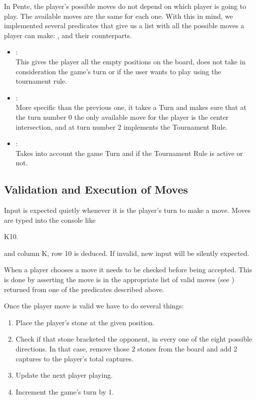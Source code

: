 \documentclass[12pt,a4paper,notitlepage]{article}
\begin{document}
In Pente, the player's possible moves do not depend on which player is going to play. The available moves are the same for each one.
With this in mind, we implemented several predicates that give us a list with all the possible moves a player can make: ,  and their  counterparts.

\begin{itemize}[noitemsep]
\item {}: \\
This gives the player all the empty positions on the board, does not take in consideration the game's turn or if the user wants to play using the tournament rule.
\item {}: \\
More specific than the previous one, it takes a Turn and makes sure that at the turn number 0 the only available move for the player is the center intersection, and at turn number 2 implements the Tournament Rule.
\item {}: \\
Takes into account the game Turn and if the Tournament Rule is active or not.
\end{itemize}

\subsection{Validation and Execution of Moves}
\label{subsec:moves}

Input is expected quietly whenever it is the player's turn to make a move.
Moves are typed into the console like
\begin{center}
	\ttfamily K10.
\end{center}
and column K, row 10 is deduced. If invalid, new input will be silently expected.

When a player chooses a move it needs to be checked before being accepted. This is done by asserting the move is in the appropriate list of valid moves (see ) returned from one of the predicates described above.

Once the player move is valid we have to do several things:

\begin{enumerate}[noitemsep,label=(\roman*)]
	\item Place the player's stone at the given position.
	\item Check if that stone bracketed the opponent, in every one of the eight possible directions. In that case, remove those 2 stones from the board and add 2 captures to the player's total captures.
	\item Update the next player playing.
	\item Increment the game's turn by 1.
\end{enumerate}
\end{document}
